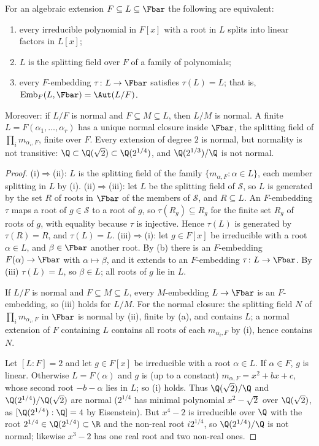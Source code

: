 \begin{proposition}[Normality]\label{prop:galois:normal}
For an algebraic extension $F\subseteq L\subseteq\Fbar$ the following are equivalent:
\begin{enumerate}[label=(\roman*)]
\item every irreducible polynomial in $F[x]$ with a root in $L$ splits into linear factors in $L[x]$;
\item $L$ is the splitting field over $F$ of a family of polynomials;
\item every $F$-embedding $\tau\colon L\to\Fbar$ satisfies $\tau(L)=L$; that is, $\mathrm{Emb}_F(L,\Fbar)=\Aut(L/F)$.
\end{enumerate}
Moreover: if $L/F$ is normal and $F\subseteq M\subseteq L$, then $L/M$ is normal. A finite $L=F(\alpha_1,\dots,\alpha_r)$ has a unique normal closure inside
$\Fbar$, the splitting field of $\prod_i m_{\alpha_i,F}$, finite over $F$. Every extension of degree $2$ is normal, but normality is not transitive:
$\Q\subset\Q(\sqrt2)\subset\Q(2^{1/4})$, and $\Q(2^{1/3})/\Q$ is not normal.
\end{proposition}

\begin{proof}
(i)$\Rightarrow$(ii): $L$ is the splitting field of the family $\{m_{\alpha,F}:\alpha\in L\}$, each member splitting in $L$ by (i).
(ii)$\Rightarrow$(iii): let $L$ be the splitting field of $\mathcal{S}$, so $L$ is generated by the set $R$ of roots in $\Fbar$ of the members of $\mathcal{S}$,
and $R\subseteq L$. An $F$-embedding $\tau$ maps a root of $g\in\mathcal{S}$ to a root of $g$, so $\tau(R_g)\subseteq R_g$ for the finite set $R_g$ of roots of
$g$, with equality because $\tau$ is injective. Hence $\tau(L)$ is generated by $\tau(R)=R$, and $\tau(L)=L$.
(iii)$\Rightarrow$(i): let $g\in F[x]$ be irreducible with a root $\alpha\in L$, and $\beta\in\Fbar$ another root. By
(b) there is an $F$-embedding $F(\alpha)\to\Fbar$ with $\alpha\mapsto\beta$, and it extends to an $F$-embedding
$\tau\colon L\to\Fbar$. By (iii) $\tau(L)=L$, so $\beta\in L$; all roots of $g$ lie in $L$.

If $L/F$ is normal and $F\subseteq M\subseteq L$, every $M$-embedding $L\to\Fbar$ is an $F$-embedding, so (iii) holds for $L/M$. For the normal closure: the
splitting field $N$ of $\prod_im_{\alpha_i,F}$ in $\Fbar$ is normal by (ii), finite by (a), and contains $L$; a normal
extension of $F$ containing $L$ contains all roots of each $m_{\alpha_i,F}$ by (i), hence contains $N$.

Let $[L:F]=2$ and let $g\in F[x]$ be irreducible with a root $\alpha\in L$. If $\alpha\in F$, $g$ is linear. Otherwise $L=F(\alpha)$ and $g$ is (up to a
constant) $m_{\alpha,F}=x^2+bx+c$, whose second root $-b-\alpha$ lies in $L$; so (i) holds. Thus $\Q(\sqrt2)/\Q$ and $\Q(2^{1/4})/\Q(\sqrt2)$
are normal ($2^{1/4}$ has minimal polynomial $x^2-\sqrt2$ over $\Q(\sqrt 2)$, as $[\Q(2^{1/4}):\Q]=4$ by Eisenstein). But $x^4-2$ is irreducible over $\Q$ with the
root $2^{1/4}\in\Q(2^{1/4})\subset\R$ and the non-real root $i2^{1/4}$, so $\Q(2^{1/4})/\Q$ is not normal; likewise $x^3-2$ has one real root and two non-real ones.
\end{proof}

